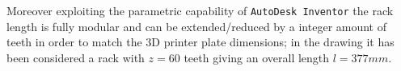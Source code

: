 	Moreover exploiting the parametric capability of \texttt{AutoDesk Inventor} the rack length is fully modular and can be extended/reduced by a integer amount of teeth in order to match the 3D printer plate dimensions; in the drawing it has been considered a rack with $z = 60$ teeth giving an overall length $l = 377mm$. 
	
	
	